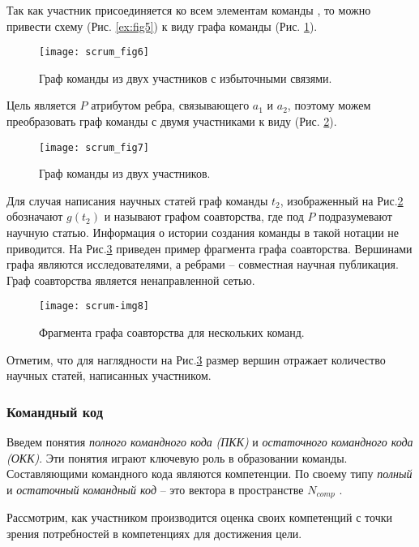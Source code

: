 Так как участник присоединяется ко всем элементам команды , то можно привести схему (Рис. \ref{ex:fig5}) к виду графа команды (Рис. \ref{ex:fig6}).

\begin{figure}[H]
  \centering
    \texttt{[image: scrum\_fig6]}
  \label{ex:fig6}
  \caption{Граф команды из двух участников с избыточными связями.}
\end{figure}  

Цель является $P$ атрибутом ребра, связывающего $a_1$ и $a_2$, поэтому можем преобразовать граф команды с двумя участниками к виду (Рис. \ref{ex:fig7}).

\begin{figure}[H]
  \centering
    \texttt{[image: scrum\_fig7]}
  \label{ex:fig7}
  \caption{Граф команды из двух участников.}
\end{figure}  

Для случая написания научных статей граф команды $t_2$, изображенный на Рис.\ref{ex:fig7} обозначают $g(t_2)$ и называют графом соавторства, где под $P$ подразумевают научную статью.
Информация о истории создания команды в такой нотации не приводится. 
На Рис.\ref{ex:fig8} приведен пример фрагмента графа соавторства.
Вершинами графа являются исследователями, а ребрами -- совместная научная публикация. 
Граф соавторства является ненаправленной сетью.
\begin{figure}[H]
  \centering
    \texttt{[image: scrum-img8]}
  \label{ex:fig8}
  \caption{Фрагмента графа соавторства для нескольких команд.}
\end{figure}  

Отметим, что для наглядности на Рис.\ref{ex:fig8} размер вершин отражает количество научных статей, написанных участником.

\subsubsection{Командный код}

Введем понятия \emph{полного командного кода} \emph{(ПКК)} и \emph{остаточного командного кода (ОКК)}.
Эти понятия играют ключевую роль в образовании команды. 
Составляющими командного кода являются компетенции. По своему типу \emph{полный} и \emph{остаточный} \emph{командный код} -- это вектора в пространстве $N_{comp}$ .

Рассмотрим, как участником производится оценка своих компетенций с точки зрения потребностей в компетенциях для достижения цели.

